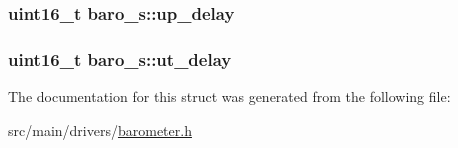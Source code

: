 \hypertarget{structbaro__s_aa275390d9662bc19ce180643294a13f7}{
\subsubsection[{up\+\_\+delay}]{\setlength{\rightskip}{0pt plus 5cm}uint16\+\_\+t baro\+\_\+s\+::up\+\_\+delay}}\label{structbaro__s_aa275390d9662bc19ce180643294a13f7}
\hypertarget{structbaro__s_ad08f70abf772fdfb765f5cac3456c886}{
\subsubsection[{ut\+\_\+delay}]{\setlength{\rightskip}{0pt plus 5cm}uint16\+\_\+t baro\+\_\+s\+::ut\+\_\+delay}}\label{structbaro__s_ad08f70abf772fdfb765f5cac3456c886}


The documentation for this struct was generated from the following file\+:\begin{DoxyCompactItemize}
\item 
src/main/drivers/\hyperlink{drivers_2barometer_8h}{barometer.\+h}\end{DoxyCompactItemize}
